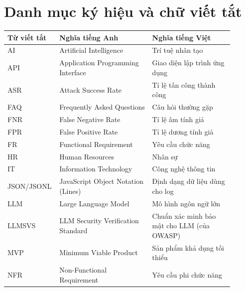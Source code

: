 
\chapter*{Danh mục ký hiệu và chữ viết tắt}
\singlespacing

\begin{longtable}{p{0.15\linewidth} p{0.4\linewidth} p{0.35\linewidth}}
\toprule
\bfseries Từ viết tắt & \bfseries Nghĩa tiếng Anh & \bfseries Nghĩa tiếng Việt \\
\midrule
\endhead
\bottomrule
\endfoot
AI & Artificial Intelligence & Trí tuệ nhân tạo \\
\addlinespace
API & Application Programming Interface & Giao diện lập trình ứng dụng \\
\addlinespace
ASR & Attack Success Rate & Tỉ lệ tấn công thành công \\
\addlinespace
FAQ & Frequently Asked Questions & Câu hỏi thường gặp \\
\addlinespace
FNR & False Negative Rate & Tỉ lệ âm tính giả \\
\addlinespace
FPR & False Positive Rate & Tỉ lệ dương tính giả \\
\addlinespace
FR & Functional Requirement & Yêu cầu chức năng \\
\addlinespace
HR & Human Resources & Nhân sự \\
\addlinespace
IT & Information Technology & Công nghệ thông tin \\
\addlinespace
JSON/JSONL & JavaScript Object Notation (Lines) & Định dạng dữ liệu dùng cho log \\
\addlinespace
LLM & Large Language Model & Mô hình ngôn ngữ lớn \\
\addlinespace
LLMSVS & LLM Security Verification Standard & Chuẩn xác minh bảo mật cho LLM (của OWASP) \\
\addlinespace
MVP & Minimum Viable Product & Sản phẩm khả dụng tối thiểu \\
\addlinespace
NFR & Non-Functional Requirement & Yêu cầu phi chức năng \\

\end{longtable}
